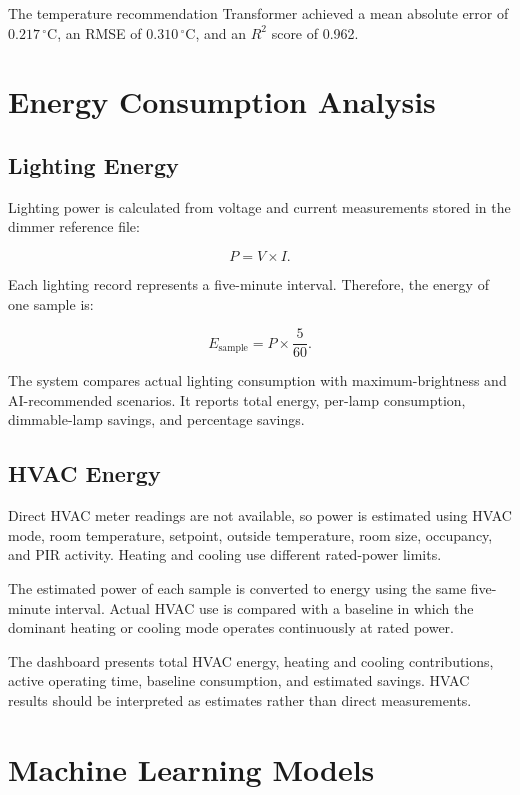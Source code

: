 The temperature recommendation Transformer achieved a mean absolute error of
$0.217\,^{\circ}\mathrm{C}$, an RMSE of
$0.310\,^{\circ}\mathrm{C}$, and an $R^2$ score of 0.962.


\chapter{Energy Consumption Analysis}
\label{chap:energy-analysis}

\section{Lighting Energy}

Lighting power is calculated from voltage and current measurements stored in
the dimmer reference file:

\[
    P = V \times I.
\]

Each lighting record represents a five-minute interval. Therefore, the energy
of one sample is:

\[
    E_{\mathrm{sample}} = P \times \frac{5}{60}.
\]

The system compares actual lighting consumption with maximum-brightness and
AI-recommended scenarios. It reports total energy, per-lamp consumption,
dimmable-lamp savings, and percentage savings.

\section{HVAC Energy}

Direct HVAC meter readings are not available, so power is estimated using HVAC
mode, room temperature, setpoint, outside temperature, room size, occupancy,
and PIR activity. Heating and cooling use different rated-power limits.

The estimated power of each sample is converted to energy using the same
five-minute interval. Actual HVAC use is compared with a baseline in which the
dominant heating or cooling mode operates continuously at rated power.

The dashboard presents total HVAC energy, heating and cooling contributions,
active operating time, baseline consumption, and estimated savings. HVAC
results should be interpreted as estimates rather than direct measurements.


\chapter{Machine Learning Models}
\label{chap:machine-learning-models}

